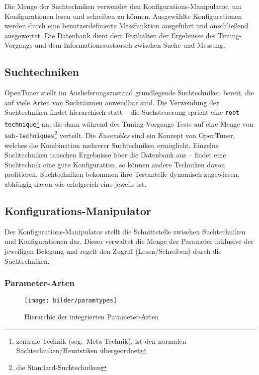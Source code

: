 \documentclass[a4paper,11pt]{scrartcl}
\begin{document}
Die Menge der Suchtechniken verwendet den Konfigurations-Manipulator, um Konfigurationen lesen und 
schreiben zu können. Ausgewählte Konfigurationen werden durch eine benutzerdefinierte Messfunktion
ausgeführt und anschließend ausgewertet. Die Datenbank dient dem Festhalten der Ergebnisse des Tuning-Vorgangs
und dem Informationsaustausch zwischen Suche und Messung.


\subsection{Suchtechniken}
OpenTuner stellt im Auslieferungszustand grundlegende Suchtechniken bereit, die auf viele Arten von 
Suchräumen anwendbar sind. Die Verwendung der Suchtechniken findet hierarchisch statt --
die Suchsteuerung spricht eine \texttt{root technique}\footnote{zentrale Technik (sog.~Meta-Technik),
ist den normalen Suchtechniken/Heuristiken übergeordnet} an, die dann während des Tuning-Vorgangs 
Tests auf eine Menge von \texttt{sub-techniques}\footnote{die Standard-Suchtechniken} verteilt. 
Die \emph{Ensembles} sind ein Konzept von OpenTuner, welches die Kombination mehrerer Suchtechniken
ermöglicht. Einzelne Suchtechniken tauschen Ergebnisse über die Datenbank aus -- findet eine 
Suchtechnik eine gute Konfiguration, so können andere Techniken davon profitieren.
Suchtechniken bekommen ihre Testanteile dynamisch zugewiesen, abhängig davon wie erfolgreich eine
jeweils ist.

\subsection{Konfigurations-Manipulator}
Der Konfigurations-Manipulator stellt die Schnittstelle zwischen Suchtechniken und Konfigurationen
dar. Dieser verwaltet die Menge der Parameter inklusive der jeweiligen Belegung und regelt den Zugriff
(Lesen/Schreiben) durch die Suchtechniken.

\subsubsection{Parameter-Arten}

\begin{figure}[h]
\begin{center}
\texttt{[image: bilder/paramtypes]}
\cite{OT-paper} \caption{Hierarchie der integrierten Parameter-Arten} 
\end{center}
\end{figure}
\end{document}
